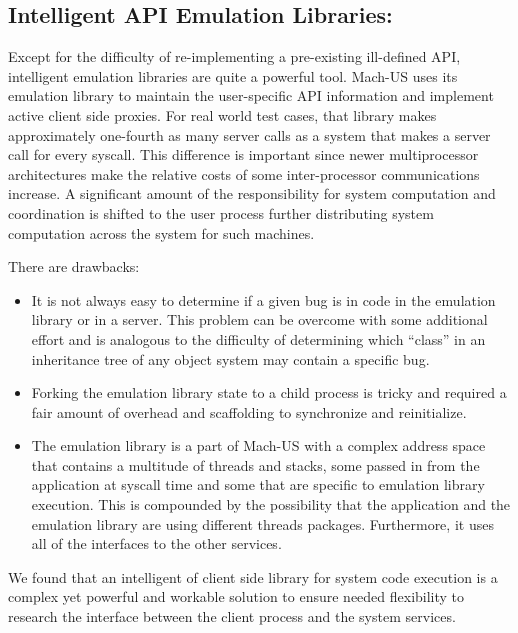 \subsection{Intelligent API Emulation Libraries: }
Except for the difficulty of re-implementing a pre-existing ill-defined API,
intelligent emulation libraries are quite a powerful tool.
Mach-US  uses its emulation library to maintain the user-specific
API information and implement active client side proxies.
For real world test cases, that library makes approximately
one-fourth as many server calls as a system that makes
a server call for every syscall.
This difference is
important since newer multiprocessor architectures make the relative
costs of some inter-processor communications increase.
A significant amount of the
responsibility for system computation and coordination is shifted
to the user process further distributing system computation across the
system for such machines.

There are drawbacks:
\begin{itemize}
\item
It is not always easy to determine if a
given bug is in code in the emulation library or in a server.  This
problem can be overcome with some additional effort and is
analogous to the difficulty of determining which ``class''
in an inheritance tree of any object system may contain a specific bug.
\item
Forking the emulation library state to a child process is tricky and
required a fair amount of overhead and scaffolding to synchronize
and reinitialize.
\item
The emulation library is a part of Mach-US
with a complex address space that contains a multitude of threads and stacks,
some passed in from the application at syscall time
and some that are specific to emulation library execution.
This is compounded by the possibility
that the application and the emulation library are
using different threads packages.
Furthermore, it uses all of the interfaces to the other services.
\end{itemize}

We found that an intelligent of client side library for system code execution
is a complex yet powerful and workable
solution to ensure needed flexibility to research
the interface between the client process and the system services.

